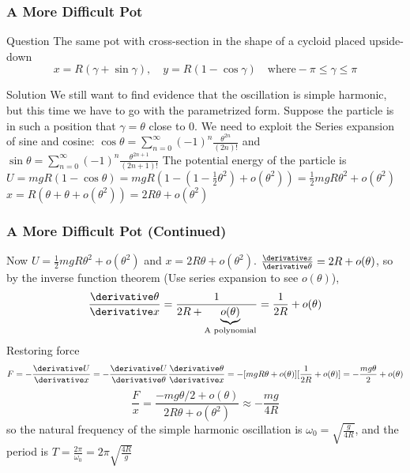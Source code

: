\begin{frame}
\frametitle{A More Difficult Pot}
\begin{block}{Question}
The same pot with cross-section in the shape of a cycloid placed upside-down
\[x=R(\gamma+\sin\gamma),\quad y=R(1-\cos\gamma)\quad\text{where} -\pi\leq\gamma\leq\pi\]
\end{block}
\begin{block}{Solution}
We still want to find evidence that the oscillation is simple harmonic, but this time we have to go with the parametrized form. Suppose the particle is in such a position that $\gamma=\theta$ \alert{close to $0$}. We need to exploit the \alert{Series expansion} of sine and cosine: $\cos \theta=\sum_{n=0}^{\infty}(-1)^{n}\frac{\theta^{2n}}{(2n)!}$ and $\sin\theta=\sum_{n=0}^{\infty}(-1)^{n}\frac{\theta^{2n+1}}{(2n+1)!}$ The \alert{potential energy} of the particle is $U=mgR(1-\cos\theta)= mgR(1-(1-\frac{1}{2}\theta^2)+o(\theta^2))=\frac{1}{2}mgR\theta^{2}+o(\theta^2)$ $x=R(\theta+\theta+o(\theta^2))=2R\theta+o(\theta^2)$
\end{block}
\end{frame}
\begin{frame}
\frametitle{A More Difficult Pot (Continued)}
Now $U=\frac{1}{2}mgR\theta^2+o(\theta^2)$ and $x=2R\theta+o(\theta^2)$. $\frac{\derivative x}{\derivative\theta}=2R+o(\theta)$, so by the \alert{inverse function theorem} (Use series expansion to see $o(\theta)$), \[\frac{\derivative \theta}{\derivative x}=\frac{1}{2R+\underbrace{o(\theta)}_{\text{A polynomial}}}=\frac{1}{2R}+o(\theta)\] \alert{Restoring force}
\[F=-\frac{\derivative U}{\derivative x}=-\frac{\derivative U}{\derivative \theta}\frac{\derivative \theta}{\derivative x}=-[mgR\theta+o(\theta)][\frac{1}{2R}+o(\theta)]=-\frac{mg\theta}{2}+o(\theta)\]\[\frac{F}{x}=\frac{-mg\theta/2+o(\theta)}{2R\theta+o(\theta^2)}\approx-\frac{mg}{4R}\] so the \alert{natural frequency} of the \alert{simple harmonic oscillation} is $\omega_0=\sqrt{\frac{g}{4R}}$, and the \alert{period} is $T=\frac{2\pi}{\omega_0}=2\pi\sqrt{\frac{4R}{g}}$
\end{frame}
